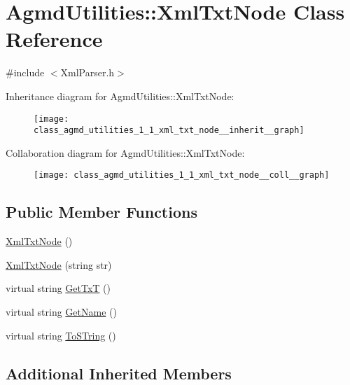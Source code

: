 \hypertarget{class_agmd_utilities_1_1_xml_txt_node}{\section{Agmd\+Utilities\+:\+:Xml\+Txt\+Node Class Reference}
\label{class_agmd_utilities_1_1_xml_txt_node}
}


{\ttfamily \#include $<$Xml\+Parser.\+h$>$}



Inheritance diagram for Agmd\+Utilities\+:\+:Xml\+Txt\+Node\+:\nopagebreak
\begin{figure}[H]
\begin{center}
\leavevmode
\texttt{[image: class\_agmd\_utilities\_1\_1\_xml\_txt\_node\_\_inherit\_\_graph]}
\end{center}
\end{figure}


Collaboration diagram for Agmd\+Utilities\+:\+:Xml\+Txt\+Node\+:\nopagebreak
\begin{figure}[H]
\begin{center}
\leavevmode
\texttt{[image: class\_agmd\_utilities\_1\_1\_xml\_txt\_node\_\_coll\_\_graph]}
\end{center}
\end{figure}
\subsection*{Public Member Functions}
\begin{DoxyCompactItemize}
\item 
\hyperlink{class_agmd_utilities_1_1_xml_txt_node_ab27c8ee86e150b14665c522f788d525a}{Xml\+Txt\+Node} ()
\item 
\hyperlink{class_agmd_utilities_1_1_xml_txt_node_a4020d2fb33c9cd87f8fe96c263fb7f12}{Xml\+Txt\+Node} (string str)
\item 
virtual string \hyperlink{class_agmd_utilities_1_1_xml_txt_node_a2cd4e68ea1d0a364c88d9735fea44224}{Get\+Tx\+T} ()
\item 
virtual string \hyperlink{class_agmd_utilities_1_1_xml_txt_node_a6d28ed2a63ee2acb5d84deb0f52def6b}{Get\+Name} ()
\item 
virtual string \hyperlink{class_agmd_utilities_1_1_xml_txt_node_a30b8af526fdd3c74de577a9bab5c0580}{To\+S\+Tring} ()
\end{DoxyCompactItemize}
\subsection*{Additional Inherited Members}


